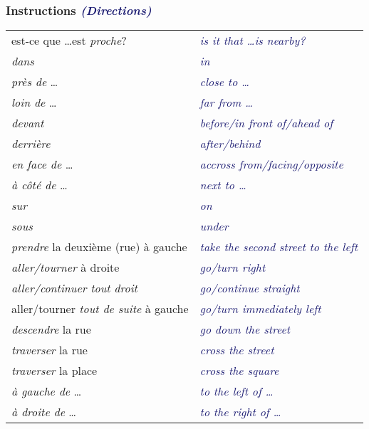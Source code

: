 \documentclass{microdoc} %
\newcommand\lEmph[1]{\textcolor{OliveGreen}{\emph{#1}}}
\newcommand\lEng[1]{\textcolor{MidnightBlue}{{\it #1}}}
\begin{document}
\subsubsection{Instructions \lEng{(Directions)}}
\begin{table}[H]
    \begin{tabular}{l l}
        est-ce que \ldots est \lEmph{proche}?           & \lEng{is it that \ldots is nearby?}\\
        \lEmph{dans}                                    & \lEng{in}\\
        \lEmph{près de} \ldots                          & \lEng{close to \ldots}\\
        \lEmph{loin de} \ldots                          & \lEng{far from \ldots}\\
        \lEmph{devant}                                  & \lEng{before/in front of/ahead of}\\
        \lEmph{derrière}                                & \lEng{after/behind}\\
        \lEmph{en face de} \ldots                       & \lEng{accross from/facing/opposite}\\
        \lEmph{à côté de} \ldots                        & \lEng{next to \ldots}\\
        \lEmph{sur}                                     & \lEng{on}\\
        \lEmph{sous}                                    & \lEng{under}\\
        \lEmph{prendre} la deuxième (rue) à gauche      & \lEng{take the second street to the left}\\
        \lEmph{aller/tourner} à droite                  & \lEng{go/turn right}\\
        \lEmph{aller/continuer tout droit}              & \lEng{go/continue straight}\\
        aller/tourner \lEmph{tout de suite} à gauche    & \lEng{go/turn immediately left}\\
        \lEmph{descendre} la rue                        & \lEng{go down the street}\\
        \lEmph{traverser} la rue                        & \lEng{cross the street}\\
        \lEmph{traverser} la place                      & \lEng{cross the square}\\
        \lEmph{à gauche de} \ldots                      & \lEng{to the left of \ldots}\\
        \lEmph{à droite de} \ldots                      & \lEng{to the right of \ldots}\\

\end{tabular}
\end{table}
\end{document}
